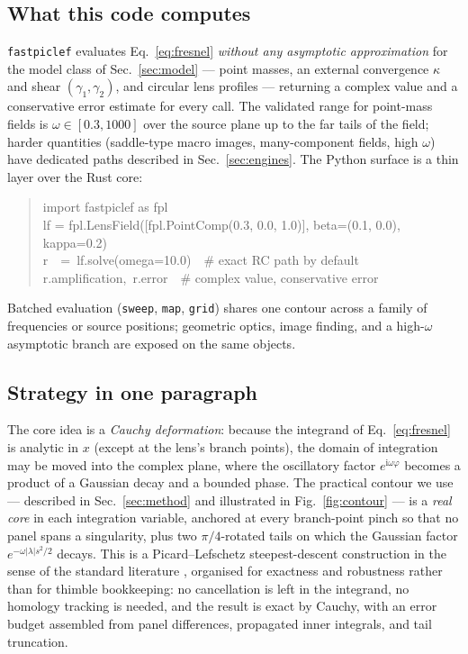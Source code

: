 \documentclass[11pt,a4paper]{article}
\newcommand{\ii}{\mathrm{i}}
\begin{document}
\subsection{What this code computes}
\label{sec:what}

\texttt{fastpiclef} evaluates Eq.~\eqref{eq:fresnel} \emph{without any
asymptotic approximation} for the model class of Sec.~\ref{sec:model} ---
point masses, an external convergence $\kappa$ and shear
$(\gamma_1,\gamma_2)$, and circular lens profiles --- returning a complex
value and a conservative error estimate for every call.  The validated range
for point-mass fields is $\omega \in [0.3, 1000]$ over the source plane up
to the far tails of the field; harder quantities (saddle-type macro images,
many-component fields, high $\omega$) have dedicated paths described in
Sec.~\ref{sec:engines}.  The Python surface is a thin layer over the Rust
core:
\begin{quote}\ttfamily
import fastpiclef as fpl\\
lf = fpl.LensField([fpl.PointComp(0.3, 0.0, 1.0)], beta=(0.1, 0.0), kappa=0.2)\\
r\ \ =\ lf.solve(omega=10.0)\ \ \# exact RC path by default\\
r.amplification,\ r.error\ \ \# complex value, conservative error
\end{quote}
Batched evaluation (\texttt{sweep}, \texttt{map}, \texttt{grid}) shares one
contour across a family of frequencies or source positions; geometric optics,
image finding, and a high-$\omega$ asymptotic branch are exposed on the same
objects.

\subsection{Strategy in one paragraph}
\label{sec:strategy}

The core idea is a \emph{Cauchy deformation}: because the integrand of
Eq.~\eqref{eq:fresnel} is analytic in $x$ (except at the lens's branch
points), the domain of integration may be moved into the complex plane,
where the oscillatory factor $e^{\ii\omega\varphi}$ becomes a product of a
Gaussian decay and a bounded phase.  The practical contour we use ---
described in Sec.~\ref{sec:method} and illustrated in
Fig.~\ref{fig:contour} --- is a \emph{real core} in each integration
variable, anchored at every branch-point pinch so that no panel spans a
singularity, plus two $\pi/4$-rotated tails on which the Gaussian factor
$e^{-\omega|\lambda|s^2/2}$ decays.  This is a Picard--Lefschetz
steepest-descent construction in the sense of the standard literature
\cite{Feldbrugge2019,Jow2021,Shi2024}, organised for exactness and
robustness rather than for thimble bookkeeping: no cancellation is left in
the integrand, no homology tracking is needed, and the result is exact by
Cauchy, with an error budget assembled from panel differences, propagated
inner integrals, and tail truncation.
\end{document}
